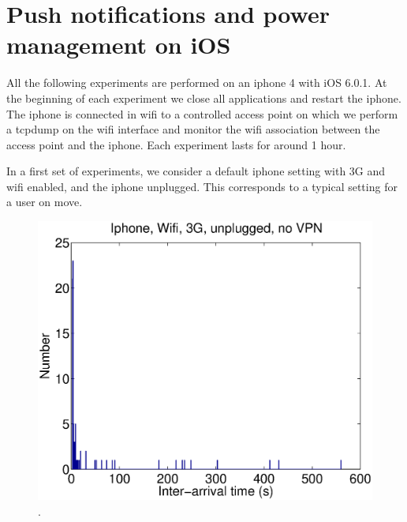 \section{Push notifications and power management on iOS}
\label{sec:pushnotification}

All the following experiments are performed on an iphone 4 with iOS
6.0.1.  At the beginning of each experiment we close all applications
and restart the iphone. The iphone is connected in wifi to a
controlled access point on which we perform a tcpdump on the wifi
interface and monitor the wifi association between the access point
and the iphone. Each experiment lasts for around 1 hour. 

In a first set of experiments, we consider a default iphone setting with
3G and wifi enabled, and the iphone unplugged. This corresponds to a
typical setting for a user on move. 




\begin{figure}
\centering
        \includegraphics[width=0.8\linewidth]{../../code/pushNotification/Fig/bw_iphone_wifi_3g_unplug_novpn_interTs.eps}
  \caption{.}
  \label{fig:}
\end{figure}

